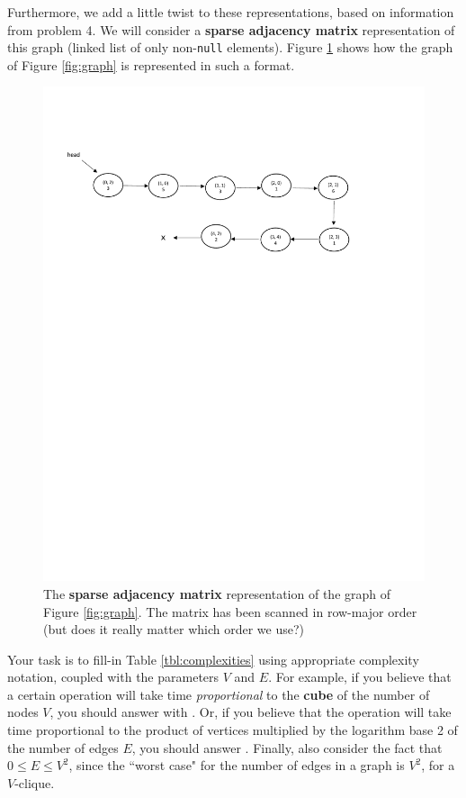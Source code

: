 \documentclass[letterpaper,12pt]{article}
\begin{document}
Furthermore, we add a little twist to these representations, based on information from problem 4. We will consider a {\bf sparse adjacency matrix} representation of this graph (linked list of only non-{\tt null} elements). Figure \ref{fig:sparseAdjMat} shows how the graph of Figure \ref{fig:graph} is represented in such a format.

\begin{figure}[H]
		\centering
		\includegraphics[scale=.8]{img/sparseAdjMat}
		\caption{The {\bf sparse adjacency matrix} representation of the graph of Figure 
		\ref{fig:graph}. The matrix has been scanned in row-major order (but does it really matter which order we use?)}
	\label{fig:sparseAdjMat}
\end{figure}

 Your task is to fill-in Table \ref{tbl:complexities} using appropriate complexity notation, coupled with the parameters $V$ and $E$. For example, if you believe that a certain operation will take time \textit{proportional} to the {\bf cube} of the number of nodes $V$, you should answer with . Or, if you believe that the operation will take time proportional to the product of vertices multiplied by the logarithm base 2 of the number of edges $E$, you should answer . Finally, also consider the fact that $0 \leq E \leq V^2$, since the ``worst case" for the number of edges in a graph is $V^2$, for a $V$-clique.
\end{document}
